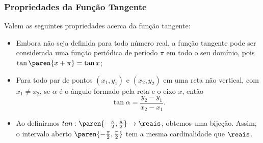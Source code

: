 \subsubsection{Propriedades da Função Tangente}

\begin{proposition}
    Valem as seguintes propriedades acerca da função tangente:

\begin{itemize}
  \item Embora não seja definida para todo número real, a função
  tangente pode ser considerada uma função periódica de período
  $\pi$ em todo o seu domínio, pois $\tan \paren{x+\pi} = \tan x$;
  \item Para todo par de pontos  $(x_1, y_1)$ e $(x_2, y_2)$ em uma reta não vertical, com $x_1 \neq x_2$, se
  $\alpha$ é o ângulo formado pela reta e o eixo $x$, então $$\tan
  \alpha = \frac {y_2 - y_1} {x_2 - x_1}.$$
  \item Ao definirmos $tan: \paren{- \frac {\pi} 2, \frac {\pi} 2} \to \reais$,
obtemos uma bijeção. Assim, o intervalo aberto $\paren{- \frac {\pi}
2, \frac {\pi} 2}$ tem a mesma cardinalidade que $\reais$.
\end{itemize}
\end{proposition}

